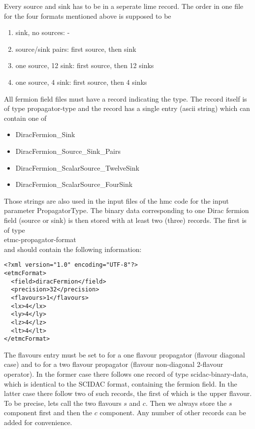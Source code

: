 Every source and sink has to be in a seperate lime record. The order
in one file for the four formats mentioned above is supposed to be 
\begin{enumerate}
\item sink, no sources: -
\item source/sink pairs: first source, then sink
\item one source, 12 sink: first source, then 12 sinks
\item one source, 4 sink: first source, then 4 sinks
\end{enumerate}
All fermion field files must have a record indicating the type. The
record itself is of type {\ttfamily propagator-type} and the
record has a single entry (ascii string) which can contain one of 
\begin{itemize}
\item {\ttfamily DiracFermion\_Sink}
\item {\ttfamily DiracFermion\_Source\_Sink\_Pairs}
\item {\ttfamily DiracFermion\_ScalarSource\_TwelveSink}
\item {\ttfamily DiracFermion\_ScalarSource\_FourSink}
\end{itemize}
Those strings are also used in the input files of the hmc code for the
input parameter {\ttfamily PropagatorType}.
The binary data corresponding to one Dirac fermion field (source or
sink) is then stored with at least two (three) records. The first is
of type \\
{\ttfamily etmc-propagator-format} \\
and should contain the following information:
\begin{verbatim}
<?xml version="1.0" encoding="UTF-8"?>
<etmcFormat>
  <field>diracFermion</field>
  <precision>32</precision>
  <flavours>1</flavours>
  <lx>4</lx>
  <ly>4</ly>
  <lz>4</lz>
  <lt>4</lt>
</etmcFormat>
\end{verbatim}
The {\ttfamily flavours} entry must be set to {} for a one
flavour propagator (flavour diagonal case) and to {} for a two
flavour propagator (flavour non-diagonal 2-flavour operator). In the
former case there follows one record of type
{\ttfamily scidac-binary-data}, which is identical to the SCIDAC
format, containing the fermion field. In the latter case there follow
two of such records, the first of which is the upper flavour. To be
precise, lets call the two flavours $s$ and $c$. Then we always store
the $s$ component first and then the $c$ component.
Any number of other records can be added for convenience.

